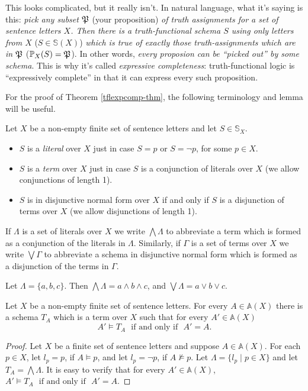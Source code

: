 \begin{aside}
    This looks complicated, but it really isn't. In natural language, what it's saying is this: \emph{pick any subset $\mfp$} (your proposition) \emph{of truth assignments for a set of sentence letters $X$. Then there is a truth-functional schema $S$ using only letters from $X$} ($S\in\mathbb{S}(X)$) \emph{which is true  of exactly those truth-assignments which are in $\mfp$} ($\prop{S}{X}=\mfp$). In other words, \emph{every proposion can be ``picked out'' by some schema}. This is why it's called \emph{expressive completeness}: truth-functional logic is ``expressively complete'' in that it can express every such proposition. 
\end{aside}

For the proof of Theorem \ref{tflexpcomp-thm}, the following terminology and lemma will be useful. 
\begin{definition}
Let $X$ be a non-empty finite set of sentence letters and let $S\in\mathbb{S}_X$.
\begin{itemize}
\item $S$ is a \emph{literal} over $X$ just in case $S = p$ or $S = \neg p$, for some $p\in X$.
\item $S$ is a \emph{term} over $X$ just in case $S$ is a conjunction of literals over $X$ (we allow conjunctions of length 1).
\item $S$ is in disjunctive normal form over $X$ if and only if $S$ is a disjunction of terms over $X$ (we allow disjunctions of length 1). 
\end{itemize}
\end{definition}
If $\Lambda$ is a set of literals over $X$ we write $\bigwedge \Lambda$ to abbreviate a term which is formed as a conjunction of the literals in $\Lambda$. Similarly, if $\Gamma$ is a set of terms over $X$ we write $\bigvee\Gamma$ to abbreviate a schema in disjunctive normal form which is formed as a disjunction of the terms in $\Gamma$.

\begin{example}
    Let $\Lambda = \{a, b, c\}$. Then $\bigwedge \Lambda = a \land b \land c$, and $\bigvee \Lambda = a \vee b \vee c$.
\end{example}

\begin{lemma}\label{tflexpcomp-lem}
Let $X$ be a non-empty finite set of sentence letters. For every $A\in\mathbb{A}(X)$ there is a schema $T_A$ which is a term over $X$ such that for every $A'\in\mathbb{A}(X)$
\[A'\models T_A\ \ \ \mbox{if and only if}\ \ \ A'=A.\]
\end{lemma}
\begin{proof}
Let $X$ be a finite set of sentence letters and suppose $A\in\mathbb{A}(X)$. For each $p\in X$, let $l_p = p$, if $A\models p$, and let $l_p = \neg p$, if $A\not\models p$. Let $\Lambda=\{l_p\mid p\in X\}$ and let $T_A = \bigwedge\Lambda$. It is easy to verify that
for every $A'\in\mathbb{A}(X)$, 
$A'\models T_A\ \ \ \mbox{if and only if}\ \ \ A'=A$. 
\end{proof}    

